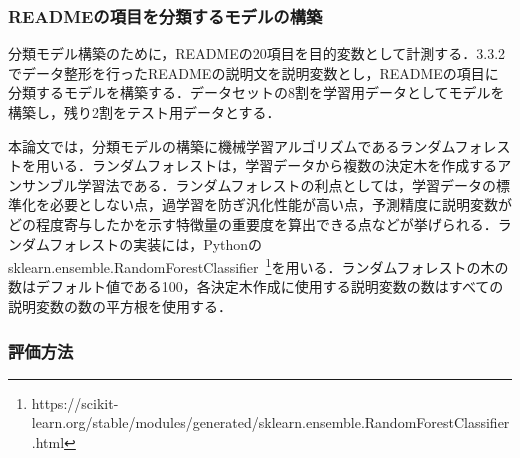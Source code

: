 \documentclass[submit]{ipsj}
\begin{document}
\subsubsection{READMEの項目を分類するモデルの構築}
分類モデル構築のために，READMEの20項目を目的変数として計測する．3.3.2でデータ整形を行ったREADMEの説明文を説明変数とし，READMEの項目に分類するモデルを構築する．データセットの8割を学習用データとしてモデルを構築し，残り2割をテスト用データとする．

本論文では，分類モデルの構築に機械学習アルゴリズムであるランダムフォレスト\cite{random_forest}を用いる．ランダムフォレストは，学習データから複数の決定木を作成するアンサンブル学習法である．ランダムフォレストの利点としては，学習データの標準化を必要としない点，過学習を防ぎ汎化性能が高い点，予測精度に説明変数がどの程度寄与したかを示す特徴量の重要度を算出できる点などが挙げられる．ランダムフォレストの実装には，Pythonのsklearn.ensemble.RandomForestClassifier~\footnote[6]{https://scikit-learn.org/stable/modules/generated/sklearn.ensemble.RandomForestClassifier.html}を用いる．ランダムフォレストの木の数はデフォルト値である100，各決定木作成に使用する説明変数の数はすべての説明変数の数の平方根を使用する．


\subsubsection{評価方法}



\end{document}
